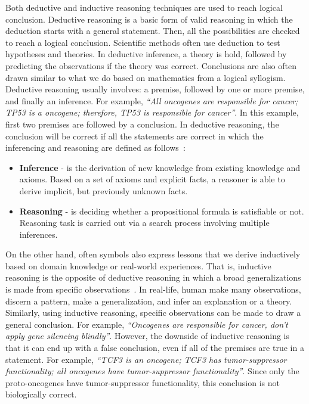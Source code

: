 \hspace*{3.5mm} Both deductive and inductive reasoning techniques are used to reach logical conclusion. Deductive reasoning is a basic form of valid reasoning in which the deduction starts with a general statement. Then, all the possibilities are checked to reach a logical conclusion. Scientific methods often use deduction to test hypotheses and theories. In deductive inference, a theory is hold, followed by predicting the observations if the theory was correct. Conclusions are also often drawn similar to what we do based on mathematics from a logical syllogism. Deductive reasoning usually involves: a premise, followed by one or more premise, and finally an inference. For example, \textit{``All oncogenes are responsible for cancer; TP53 is a oncogene; therefore, TP53 is responsible for cancer''}. In this example, first two premises are followed by a conclusion. In deductive reasoning, the conclusion will be correct if all the statements are correct in which the inferencing and reasoning are defined as follows~\cite{hogan2020knowledge}: 

\begin{itemize}[noitemsep]
    \item \textbf{Inference} - is the derivation of new knowledge from existing knowledge and axioms. Based on a set of axioms and explicit facts, a reasoner is able to derive implicit, but previously unknown facts. 
    \item \textbf{Reasoning} - is deciding whether a propositional formula is satisfiable or not. Reasoning task is carried out via a search process involving multiple inferences.
\end{itemize}

\hspace*{3.5mm} On the other hand, often symbols also express lessons that we derive inductively based on domain knowledge or real-world experiences. That is, inductive reasoning is the opposite of deductive reasoning in which a broad generalizations is made from specific observations~\cite{hogan2020knowledge}. In real-life, human make many observations, discern a pattern, make a generalization, and infer an explanation or a theory. Similarly, using inductive reasoning, specific observations can be made to draw a general conclusion. For example, \textit{``Oncogenes are responsible for cancer, don't apply gene silencing blindly''}. 
However, the downside of inductive reasoning is that it can end up with a false conclusion, even if all of the premises are true in a statement. For example, \textit{``TCF3 is an oncogene; TCF3 has tumor-suppressor functionality; all oncogenes have tumor-suppressor functionality''}. Since only the proto-oncogenes have tumor-suppressor functionality, this conclusion is not biologically correct.

